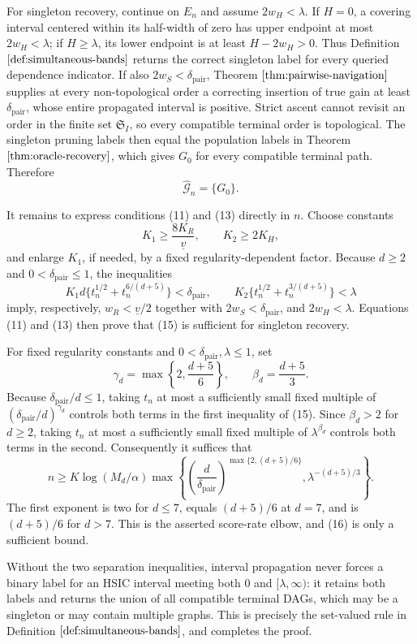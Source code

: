 For singleton recovery, continue on \(E_n\) and assume \(2w_H<\lambda\). If \(H=0\), a covering interval centered within its half-width of zero has upper endpoint at most \(2w_H<\lambda\); if \(H\ge\lambda\), its lower endpoint is at least \(H-2w_H>0\). Thus Definition \(\ref{def:simultaneous-bands}\) returns the correct singleton label for every queried dependence indicator. If also \(2w_S<\delta_{\mathrm{pair}}\), Theorem \(\ref{thm:pairwise-navigation}\) supplies at every non-topological order a correcting insertion of true gain at least \(\delta_{\mathrm{pair}}\), whose entire propagated interval is positive. Strict ascent cannot revisit an order in the finite set \(\mathfrak S_I\), so every compatible terminal order is topological. The singleton pruning labels then equal the population labels in Theorem \(\ref{thm:oracle-recovery}\), which gives \(G_0\) for every compatible terminal path. Therefore
\[
\widehat{\mathcal G}_n=\{G_0\}. \tag{13}
\]

It remains to express conditions (11) and (13) directly in \(n\). Choose constants
\[
K_1\ge\frac{8K_R}{\underline v},
\qquad K_2\ge2K_H, \tag{14}
\]
and enlarge \(K_1\), if needed, by a fixed regularity-dependent factor. Because \(d\ge2\) and \(0<\delta_{\mathrm{pair}}\le1\), the inequalities
\[
K_1d\{t_n^{1/2}+t_n^{6/(d+5)}\}<\delta_{\mathrm{pair}},
\qquad
K_2\{t_n^{1/2}+t_n^{3/(d+5)}\}<\lambda \tag{15}
\]
imply, respectively, \(w_R<\underline v/2\) together with \(2w_S<\delta_{\mathrm{pair}}\), and \(2w_H<\lambda\). Equations (11) and (13) then prove that (15) is sufficient for singleton recovery.

For fixed regularity constants and \(0<\delta_{\mathrm{pair}},\lambda\le1\), set
\[
\gamma_d=\max\left\{2,\frac{d+5}{6}\right\},
\qquad \beta_d=\frac{d+5}{3}.
\]
Because \(\delta_{\mathrm{pair}}/d\le1\), taking \(t_n\) at most a sufficiently small fixed multiple of \((\delta_{\mathrm{pair}}/d)^{\gamma_d}\) controls both terms in the first inequality of (15). Since \(\beta_d>2\) for \(d\ge2\), taking \(t_n\) at most a sufficiently small fixed multiple of \(\lambda^{\beta_d}\) controls both terms in the second. Consequently it suffices that
\[
n\ge K\log(M_d/\alpha)
\max\left\{
\left(\frac d{\delta_{\mathrm{pair}}}\right)^{\max\{2,(d+5)/6\}},
\lambda^{-(d+5)/3}
\right\}. \tag{16}
\]
The first exponent is two for \(d\le7\), equals \((d+5)/6\) at \(d=7\), and is \((d+5)/6\) for \(d>7\). This is the asserted score-rate elbow, and (16) is only a sufficient bound.

Without the two separation inequalities, interval propagation never forces a binary label for an HSIC interval meeting both \(0\) and \([\lambda,\infty)\): it retains both labels and returns the union of all compatible terminal DAGs, which may be a singleton or may contain multiple graphs. This is precisely the set-valued rule in Definition \(\ref{def:simultaneous-bands}\), and completes the proof.
